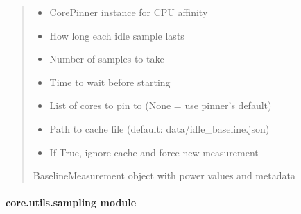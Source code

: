 \documentclass[letterpaper,10pt,english]{sphinxmanual}
\begin{document}
\begin{fulllineitems}
\begin{quote}
\begin{description}
\begin{itemize}
\item {} 
\sphinxAtStartPar
{} \textendash{} CorePinner instance for CPU affinity

\item {} 
\sphinxAtStartPar
{} \textendash{} How long each idle sample lasts

\item {} 
\sphinxAtStartPar
{} \textendash{} Number of samples to take

\item {} 
\sphinxAtStartPar
{} \textendash{} Time to wait before starting

\item {} 
\sphinxAtStartPar
{} \textendash{} List of cores to pin to (None = use pinner’s default)

\item {} 
\sphinxAtStartPar
{} \textendash{} Path to cache file (default: data/idle\_baseline.json)

\item {} 
\sphinxAtStartPar
{} \textendash{} If True, ignore cache and force new measurement

\end{itemize}

\sphinxAtStartPar
BaselineMeasurement object with power values and metadata

\end{description}\end{quote}

\end{fulllineitems}


\sphinxstepscope


\paragraph{core.utils.sampling module}
\label{\detokenize{core.utils.sampling:module-core.utils.sampling}}\label{\detokenize{core.utils.sampling:core-utils-sampling-module}}\label{\detokenize{core.utils.sampling::doc}}
\end{document}
